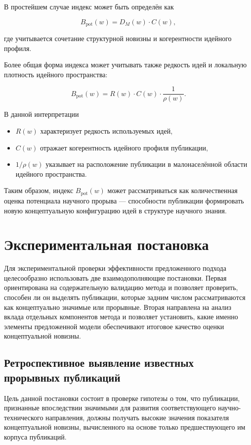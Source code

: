 \documentclass[review,3p,times]{elsarticle}
\begin{document}
В простейшем случае индекс может быть определён как

\[
B_{\mathrm{pot}}(w)=D_M(w)\cdot C(w),
\]

где учитывается сочетание структурной новизны и когерентности идейного профиля.

Более общая форма индекса может учитывать также редкость идей и локальную плотность идейного пространства:

\[
B_{\mathrm{pot}}(w)=R(w)\cdot C(w)\cdot \frac{1}{\rho(w)}.
\]

В данной интерпретации

\begin{itemize}
\item $R(w)$ характеризует редкость используемых идей,
\item $C(w)$ отражает когерентность идейного профиля публикации,
\item $1/\rho(w)$ указывает на расположение публикации в малонаселённой области идейного пространства.
\end{itemize}

Таким образом, индекс $B_{\mathrm{pot}}(w)$ может рассматриваться как количественная оценка потенциала научного прорыва — способности публикации формировать новую концептуальную конфигурацию идей в структуре научного знания.






\section{Экспериментальная постановка}

Для экспериментальной проверки эффективности предложенного подхода целесообразно использовать две взаимодополняющие постановки. Первая ориентирована на содержательную валидацию метода и позволяет проверить, способен ли он выделять публикации, которые задним числом рассматриваются как концептуально значимые или прорывные. Вторая направлена на анализ вклада отдельных компонентов метода и позволяет установить, какие именно элементы предложенной модели обеспечивают итоговое качество оценки концептуальной новизны.

\subsection{Ретроспективное выявление известных прорывных публикаций}

Цель данной постановки состоит в проверке гипотезы о том, что публикации, признанные впоследствии значимыми для развития соответствующего научно-технического направления, должны получать высокие значения показателя концептуальной новизны, вычисленного на основе только предшествующего им корпуса публикаций.
\end{document}
